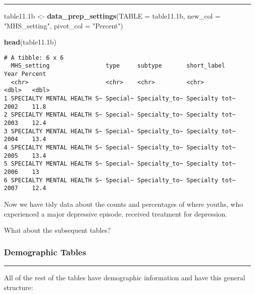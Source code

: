 \documentclass[
]{article}
\newenvironment{Shaded}{\begin{snugshade}}{\end{snugshade}}
\newcommand{\DataTypeTok}[1]{\textcolor[rgb]{0.13,0.29,0.53}{#1}}
\newcommand{\FloatTok}[1]{\textcolor[rgb]{0.00,0.00,0.81}{#1}}
\newcommand{\KeywordTok}[1]{\textcolor[rgb]{0.13,0.29,0.53}{\textbf{#1}}}
\newcommand{\NormalTok}[1]{#1}
\newcommand{\StringTok}[1]{\textcolor[rgb]{0.31,0.60,0.02}{#1}}
\begin{document}
\begin{center}\rule{0.5\linewidth}{0.5pt}\end{center}

\begin{Shaded}
\begin{Highlighting}[]
\NormalTok{table11}\FloatTok{.1}\NormalTok{b <-}\StringTok{ }
\StringTok{  }\KeywordTok{data_prep_settings}\NormalTok{(}\DataTypeTok{TABLE =}\NormalTok{ table11}\FloatTok{.1}\NormalTok{b, }
                     \DataTypeTok{new_col =} \StringTok{"MHS_setting"}\NormalTok{,}
                     \DataTypeTok{pivot_col =} \StringTok{"Percent"}\NormalTok{)}

\KeywordTok{head}\NormalTok{(table11}\FloatTok{.1}\NormalTok{b)}
\end{Highlighting}
\end{Shaded}

\begin{verbatim}
# A tibble: 6 x 6
  MHS_setting                type     subtype       short_label     Year Percent
  <chr>                      <chr>    <chr>         <chr>          <dbl>   <dbl>
1 SPECIALTY MENTAL HEALTH S~ Special~ Specialty_to~ Specialty tot~  2002    11.8
2 SPECIALTY MENTAL HEALTH S~ Special~ Specialty_to~ Specialty tot~  2003    12.4
3 SPECIALTY MENTAL HEALTH S~ Special~ Specialty_to~ Specialty tot~  2004    13.4
4 SPECIALTY MENTAL HEALTH S~ Special~ Specialty_to~ Specialty tot~  2005    13.4
5 SPECIALTY MENTAL HEALTH S~ Special~ Specialty_to~ Specialty tot~  2006    13  
6 SPECIALTY MENTAL HEALTH S~ Special~ Specialty_to~ Specialty tot~  2007    12.4
\end{verbatim}

Now we have tidy data about the counts and percentages of where youths,
who experienced a major depressive episode, received treatment for
depression.

What about the subsequent tables?

\hypertarget{demographic-tables}{%
\subsubsection{\texorpdfstring{\textbf{Demographic
Tables}}{Demographic Tables}}\label{demographic-tables}}

\begin{center}\rule{0.5\linewidth}{0.5pt}\end{center}

All of the rest of the tables have demographic information and have this
general structure:
\end{document}
